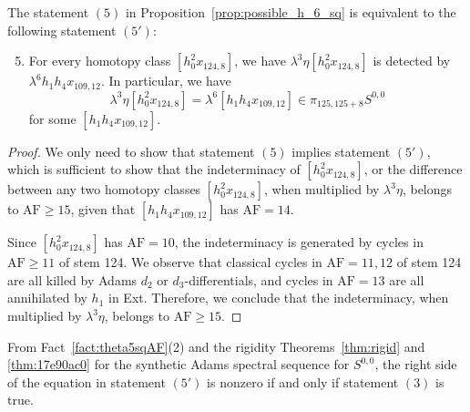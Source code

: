 \documentclass{amsart}
\numberwithin{equation}{section}
\newcommand{\AF}{\mathrm{AF}}
\begin{document}
\begin{lemma} \label{lem:equistate5}
    The statement $(5)$ in Proposition~\ref{prop:possible_h_6_sq} is equivalent to the following statement $(5')$:
    \begin{enumerate}[label=(\arabic*')]\setcounter{enumi}{4} 
    \item For every homotopy class $[h_0^2x_{124,8}]$, we have
    $\lambda^3 \eta [h_0^2x_{124,8}]$ is detected by $\lambda^6 h_1h_4x_{109,12}$. In particular, we have 
    $$\lambda^3 \eta [h_0^2x_{124,8}] = \lambda^6 [h_1h_4x_{109,12}] \in \pi_{125,125+8} S^{0,0}$$
    for some $[h_1h_4x_{109,12}]$.
    \end{enumerate}
\end{lemma}

\begin{proof}
    We only need to show that statement $(5)$ implies statement $(5')$, which is sufficient to show that the indeterminacy of $[h_0^2x_{124,8}]$, or the difference between any two homotopy classes $[h_0^2x_{124,8}]$, when multiplied by $\lambda^3 \eta$, belongs to $\AF \ge 15$, given that $[h_1h_4x_{109,12}]$ has $\AF=14$.

    Since $[h_0^2x_{124,8}]$ has $\AF=10$, the indeterminacy is generated by cycles in $\AF \ge 11$ of stem 124. We observe that classical cycles in $\AF=11, 12$ of stem 124 are all killed by Adams $d_2$ or $d_3$-differentials, and cycles in $\AF=13$ are all annihilated by $h_1$ in Ext. Therefore, we conclude that the indeterminacy, when multiplied by $\lambda^3 \eta$, belongs to $\AF \ge 15$.
\end{proof}

\begin{remark}
    From Fact~\ref{fact:theta5sqAF}(2) and the rigidity Theorems~\ref{thm:rigid} and \ref{thm:17e90ac0} for the synthetic Adams spectral sequence for $S^{0,0}$, the right side of the equation in statement $(5')$ is nonzero if and only if statement $(3)$ is true.
\end{remark}




\end{document}
